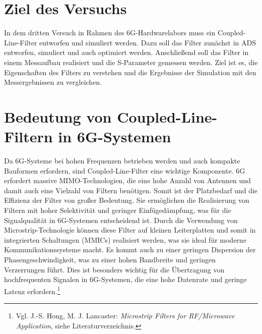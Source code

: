 \section{Ziel des Versuchs}
    In dem dritten Versuch in Rahmen des 6G-Hardwarelabors muss ein Coupled-Line-Filter entworfen und simuliert werden. Dazu soll das Filter zunächst in ADS entworfen, simuliert und auch optimiert werden. 
    Anschließend soll das Filter in einem Messaufbau realisiert und die S-Parameter gemessen werden. Ziel ist es, die Eigenschaften des Filters zu verstehen und die Ergebnisse der Simulation mit den Messergebnissen zu vergleichen.
\section{Bedeutung von Coupled-Line-Filtern in 6G-Systemen}
    Da 6G-Systeme bei hohen Frequenzen betrieben werden und auch kompakte Bauformen erfordern, sind Coupled-Line-Filter eine wichtige Komponente. 6G erfordert massive MIMO-Technologien, die eine hohe Anzahl von Antennen und damit auch eine Vielzahl von Filtern benötigen.
    Somit ist der Platzbedarf und die Effizienz der Filter von großer Bedeutung.
    Sie ermöglichen die Realisierung von Filtern mit hoher Selektivität und geringer Einfügedämpfung, was für die Signalqualität in 6G-Systemen entscheidend ist.
    Durch die Verwendung von Microstrip-Technologie können diese Filter auf kleinen Leiterplatten und somit in integrierten Schaltungen (MMICs) realisiert werden, was sie ideal für moderne Kommunikationssysteme macht.
    Es kommt auch zu einer geringen Dispersion der Phasengeschwindigkeit, was zu einer hohen Bandbreite und geringen Verzerrungen führt. Dies ist besonders wichtig für die Übertragung von hochfrequenten Signalen in 6G-Systemen, die eine hohe Datenrate und geringe Latenz erfordern.\footnote{Vgl. J.-S. Hong, M. J. Lancaster: \textit{Microstrip Filters for RF/Microwave Application}, siehe Literaturverzeichnis.}
\clearpage